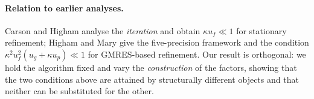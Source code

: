 \paragraph{Relation to earlier analyses.}
Carson and Higham \cite{ch2018} analyse the \emph{iteration} and obtain
$\kappa u_f\ll1$ for stationary refinement; Higham and Mary \cite{hm2022} give
the five-precision framework and the condition
$\kappa^2u_f^2(u_g+\kappa u_p)\ll1$ for GMRES-based refinement. Our result is
orthogonal: we hold the algorithm fixed and vary the \emph{construction} of the
factors, showing that the two conditions above are attained by structurally
different objects and that neither can be substituted for the other.
